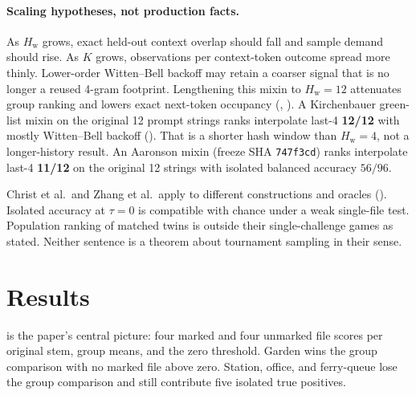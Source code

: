 \documentclass[11pt,a4paper]{article}
\theoremstyle{definition}
\newcommand{\Hw}{H_{\mathrm{w}}}
\newcommand{\Ktop}{K}
\begin{document}
\paragraph{Scaling hypotheses, not production facts.}
As $\Hw$ grows, exact held-out context overlap should fall and sample
demand should rise. As $\Ktop$ grows, observations per context-token
outcome spread more thinly. Lower-order Witten--Bell backoff may retain
a coarser signal that is no longer a reused 4-gram footprint. Lengthening
this mixin to $\Hw=12$ attenuates group ranking and lowers exact
next-token occupancy (, ). A Kirchenbauer
green-list mixin on the original 12 prompt strings ranks interpolate
last-4 \textbf{12/12} with mostly Witten--Bell backoff ().
That is a shorter hash window than $\Hw=4$, not a longer-history result.
An Aaronson mixin (freeze SHA \texttt{747f3cd}) ranks interpolate last-4
\textbf{11/12} on the original 12 strings with isolated balanced accuracy
$56/96$.

Christ et al.\ and Zhang et al.\ apply to different constructions and
oracles (). Isolated accuracy at $\tau=0$ is
compatible with chance under a weak single-file test. Population ranking of matched
twins is outside their single-challenge games as stated. Neither
sentence is a theorem about tournament sampling in their sense.

\FloatBarrier
\section{Results}
\label{sec:results}

 is the paper's central picture: four marked and four
unmarked file scores per original stem, group means, and the zero
threshold. Garden wins the group comparison with no marked file above
zero. Station, office, and ferry-queue lose the group comparison and
still contribute five isolated true positives.
\end{document}
